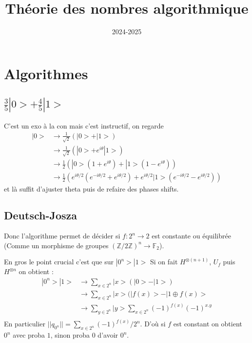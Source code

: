\documentclass[a4paper,12pt]{book}
\title{Théorie des nombres algorithmique}
\date{2024-2025}
\newcommand{\Z}{\mathbb{Z}}
\newcommand{\F}{\mathbb F}
\theoremstyle{plain}
\theoremstyle{definition}
\theoremstyle{remark}
\begin{document}
\maketitle
\tableofcontents

\chapter{Algorithmes}
\section{$\frac{3}{5}|0>+\frac{4}{5}|1>$}

C'est un exo à la con mais c'est instructif, on regarde
\begin{align*}
    |0>&\to \frac{1}{\sqrt 2}(|0>+|1>)\\
       &\to \frac{1}{\sqrt 2}(|0>+e^{i\theta}|1>)\\
       &\to \frac{1}{2}(|0>(1+e^{i\theta})+|1>(1-e^{i\theta}))\\
       &\to \frac{1}{2}(e^{i\theta /2}(e^{-i\theta /2}+e^{i\theta /2})
       +e^{i\theta /2}|1>(e^{-i\theta /2}-e^{i\theta /2}))
\end{align*}
et là suffit d'ajuster theta puis de refaire des phases shifts.

\section{Deutsch-Josza}
Donc l'algorithme permet de décider si $f\colon 2^n\to 2$ est constante
ou équilibrée (Comme un morphisme de groupes $(\Z/2\Z)^n\to \F_2$).
\newline

En gros le point crucial c'est que sur $|0^n>|1>$
Si on fait $H^{\otimes (n+1)}$, $U_f$ puis $H^{\otimes n}$ on obtient :
\begin{align*}
    |0^n>|1>&\to \sum_{x\in 2^n}|x>(|0>-|1>)\\
            &\to \sum_{x\in 2^n}|x>(|f(x)>-|1\oplus f(x)>\\
            &\to \sum_{y\in 2^n}|y>\sum_{x\in 2^n}(-1)^{f(x)}(-1)^{x.y}\\
\end{align*}
En particulier $||q_{0^n}||=\sum_{x\in 2^n} (-1)^{f(x)}/2^n$. D'où
si $f$ est constant on obtient $0^n$ avec proba $1$, sinon proba $0$ 
d'avoir $0^n$.
\end{document}
